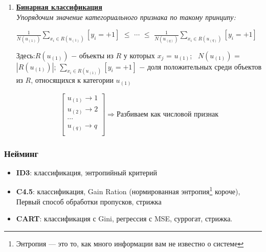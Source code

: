 \begin{enumerate}
                \item \underline{\textbf{Бинарная классификация}}\\
                    \textit{Упорядочим значение категориального признака по такому принципу:}
                    \begin{center}
                    \large
                        $\frac{1}{N(u_{(1)})}\sum\limits_{x_i \in R(u_{(1)})}[y_i = +1]$ $\leq$ $\cdots$ $\leq$ $\frac{1}{N(u_{(q)})}\sum\limits_{x_i \in R(u_{(q)})}[y_i = +1]$
                    \end{center}
                    Здесь:\quad $R(u_{(1)})$ $-$ объекты из $R$ у которых $x_j$ = $u_{(1)}$; \quad\ $N(u_{(1)})$ = $|R(u_{(1)})|$; \quad $\sum\limits_{x_i \in R(u_{(1)})}[y_i = +1]$ $-$ доля положительных среди объектов из $R$, относящихся к категории $u_{(1)}$
                    \begin{center}
                        \begin{equation}
    
                        \begin{bmatrix}
                          u_{(1)} \longrightarrow 1 \\
                          u_{(2)} \longrightarrow 2 \\
                          \cdots \\
                          u_{(q)} \longrightarrow q \\
                        \end{bmatrix}
                        \Longrightarrow \text{Разбиваем как числовой признак} 
                        \end{equation}
                    \end{center}


            \end{enumerate}

    \subsubsection{Нейминг}
        \begin{itemize}
            \item \textbf{ID3}: классификация, энтропийный критерий
            \item \textbf{C4.5}: классификация, Gain Ration (нормированная энтропия\footnote{Энтропия — это то, как много информации вам не известно о системе} короче), Первый способ обработки пропусков, стрижка
            \item \textbf{CART}: классификация с Gini, регрессия с MSE, суррогат, стрижка.
        \end{itemize}

